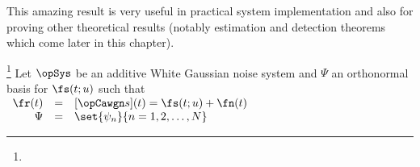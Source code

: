 This amazing result is very useful in practical system implementation
and also for proving other theoretical results
(notably estimation and detection theorems which come later
in this chapter).


\begin{theorem}
\footnote{
  }
\label{thm:sstat}
 
  
Let $\opSys$ be an additive White Gaussian noise system and
$\Psi$ an orthonormal basis for $\fs(t;u)$ such that
\\\indentx$\begin{array}{rcl}
   \fr(t)&=& [\opCawgn s](t) = \fs(t;u) + \fn(t)      \\
   \Psi  &=& \set{\psi_n}{n=1,2,\ldots, N}
\end{array}$
\end{theorem}

